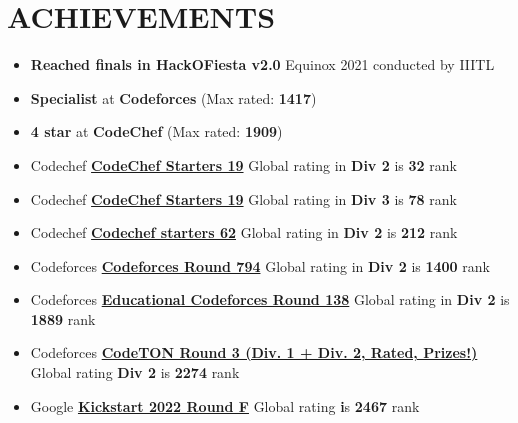 \documentclass[12pt]{article}
\begin{document}
\section*{ACHIEVEMENTS}
\begin{itemize}[leftmargin=*, topsep=0pt,itemsep=2pt,partopsep=2pt, parsep=2pt]
\item {\textbf{Reached finals in HackOFiesta v2.0} Equinox 2021 conducted by IIITL}
\item \textbf{Specialist} at \textbf{Codeforces} (Max rated: \textbf{1417})
\item \textbf{4 star} at \textbf{CodeChef} (Max rated: \textbf{1909})
\item Codechef \href{https://www.codechef.com/rankings/START64B?search=tanishka125}{\textbf{CodeChef Starters 19}} Global rating in \textbf{Div 2} is \textbf{32} rank
\item Codechef \href{https://www.codechef.com/rankings/START19C?search=tanishka125}{\textbf{CodeChef Starters 19}} Global rating in \textbf{Div 3} is \textbf{78} rank
\item Codechef \href{https://www.codechef.com/rankings/START62B?itemsPerPage=100&order=asc&page=1&search=tanishka125&sortBy=rank}{\textbf{Codechef starters 62}} Global rating in \textbf{Div 2} is \textbf{212} rank
\item Codeforces \href{https://codeforces.com/contest/1686/standings/participant/133609891#p133609891}{\textbf{Codeforces Round 794}} Global rating in \textbf{Div 2} is \textbf{1400} rank
\item Codeforces \href{https://codeforces.com/contest/1749/standings/participant/142527940#p142527940}{\textbf{Educational Codeforces Round 138}} Global rating in \textbf{Div 2} is \textbf{1889} rank  
\item Codeforces \href{https://codeforces.com/contest/1750/standings/participant/143608695#p143608695}{\textbf{CodeTON Round 3 (Div. 1 + Div. 2, Rated, Prizes!)}} Global rating \textbf{Div 2} is \textbf{2274} rank
\item Google \href{https://codingcompetitions.withgoogle.com/kickstart/submissions/00000000008cb409/0000000000648019} {\textbf{Kickstart 2022 Round F}} Global rating  \textbf is \textbf{2467} rank

\end{itemize}
\end{document}
